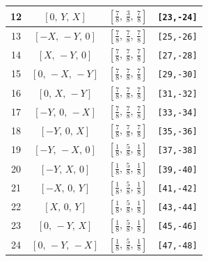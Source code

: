 \documentclass[fleqn,8pt]{jsarticle}
\begin{document}
\begin{longtable}{cccc}
12 & $\left[ 0,\, Y,\, X \right]$ & $\left[ \frac{7}{8},\, \frac{3}{8},\, \frac{7}{8} \right]$ & {\tt [23,-24]} \\ \hline
13 & $\left[ - X,\, - Y,\, 0 \right]$ & $\left[ \frac{7}{8},\, \frac{7}{8},\, \frac{7}{8} \right]$ & {\tt [25,-26]} \\ \hline
14 & $\left[ X,\, - Y,\, 0 \right]$ & $\left[ \frac{7}{8},\, \frac{7}{8},\, \frac{7}{8} \right]$ & {\tt [27,-28]} \\ \hline
15 & $\left[ 0,\, - X,\, - Y \right]$ & $\left[ \frac{7}{8},\, \frac{7}{8},\, \frac{7}{8} \right]$ & {\tt [29,-30]} \\ \hline
16 & $\left[ 0,\, X,\, - Y \right]$ & $\left[ \frac{7}{8},\, \frac{7}{8},\, \frac{7}{8} \right]$ & {\tt [31,-32]} \\ \hline
17 & $\left[ - Y,\, 0,\, - X \right]$ & $\left[ \frac{7}{8},\, \frac{7}{8},\, \frac{7}{8} \right]$ & {\tt [33,-34]} \\ \hline
18 & $\left[ - Y,\, 0,\, X \right]$ & $\left[ \frac{7}{8},\, \frac{7}{8},\, \frac{7}{8} \right]$ & {\tt [35,-36]} \\ \hline
19 & $\left[ - Y,\, - X,\, 0 \right]$ & $\left[ \frac{1}{8},\, \frac{5}{8},\, \frac{1}{8} \right]$ & {\tt [37,-38]} \\ \hline
20 & $\left[ - Y,\, X,\, 0 \right]$ & $\left[ \frac{1}{8},\, \frac{5}{8},\, \frac{1}{8} \right]$ & {\tt [39,-40]} \\ \hline
21 & $\left[ - X,\, 0,\, Y \right]$ & $\left[ \frac{1}{8},\, \frac{5}{8},\, \frac{1}{8} \right]$ & {\tt [41,-42]} \\ \hline
22 & $\left[ X,\, 0,\, Y \right]$ & $\left[ \frac{1}{8},\, \frac{5}{8},\, \frac{1}{8} \right]$ & {\tt [43,-44]} \\ \hline
23 & $\left[ 0,\, - Y,\, X \right]$ & $\left[ \frac{1}{8},\, \frac{5}{8},\, \frac{1}{8} \right]$ & {\tt [45,-46]} \\ \hline
24 & $\left[ 0,\, - Y,\, - X \right]$ & $\left[ \frac{1}{8},\, \frac{5}{8},\, \frac{1}{8} \right]$ & {\tt [47,-48]} \\
\end{longtable}
\renewcommand{\arraystretch}{1.2}
\end{document}
